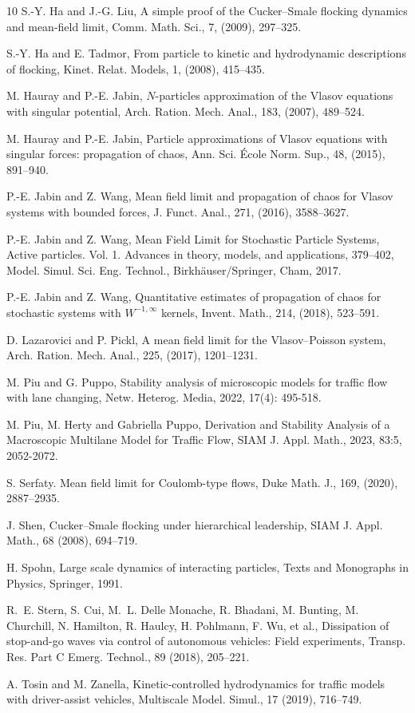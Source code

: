 \documentclass[10pt, reqno]{amsart}
\theoremstyle{definition}
\theoremstyle{remark}
\numberwithin{equation}{section}
\begin{document}
\begin{thebibliography}{10}
 S.-Y. Ha and J.-G. Liu, A simple proof of the Cucker--Smale flocking dynamics and mean-field limit, Comm. Math. Sci., 7, (2009), 297--325.

 S.-Y. Ha and E. Tadmor, From particle to kinetic and hydrodynamic descriptions of flocking, Kinet. Relat. Models, 1, (2008), 415--435.

 M. Hauray and P.-E. Jabin, $N$-particles approximation of the Vlasov equations with singular potential, Arch. Ration. Mech. Anal., 183, (2007), 489--524. 

 M. Hauray and P.-E. Jabin, Particle approximations of Vlasov equations with singular forces: propagation of chaos, Ann. Sci. \'Ecole Norm. Sup., 48, (2015), 891--940.

 P.-E. Jabin and Z. Wang, Mean field limit and propagation of chaos for Vlasov systems with bounded forces, J. Funct. Anal., 271, (2016), 3588--3627.

 P.-E. Jabin and Z. Wang, Mean Field Limit for Stochastic Particle Systems, Active particles. Vol. 1. Advances in theory, models, and applications, 379--402, Model. Simul. Sci. Eng. Technol., Birkh\"auser/Springer, Cham, 2017.

 P.-E. Jabin and Z. Wang, Quantitative estimates of propagation of chaos for stochastic systems with $W^{-1,\infty}$ kernels, Invent. Math., 214, (2018), 523--591.

 D. Lazarovici and P. Pickl, A mean field limit for the Vlasov--Poisson system, Arch. Ration. Mech. Anal., 225, (2017), 1201--1231.

 M. Piu and G. Puppo, Stability analysis of microscopic models for traffic flow with lane changing, Netw. Heterog. Media, 2022, 17(4): 495-518.

 M. Piu, M. Herty and Gabriella Puppo, Derivation and Stability Analysis of a Macroscopic Multilane Model for Traffic Flow, SIAM J. Appl. Math., 2023, 83:5, 2052-2072.

 S. Serfaty. Mean field limit for Coulomb-type flows, Duke Math. J., 169, (2020), 2887--2935.

 J. Shen, Cucker--Smale flocking under hierarchical leadership, SIAM J. Appl. Math., 68 (2008), 694--719.


 H. Spohn, Large scale dynamics of interacting particles, Texts and Monographs in Physics, Springer, 1991.

  R.~E. Stern, S. Cui, M.~L. Delle Monache, R. Bhadani, M. Bunting, M. Churchill, N. Hamilton, R. Haulcy, H. Pohlmann, F. Wu, et al., Dissipation of stop-and-go waves via control of autonomous vehicles: Field experiments, Transp. Res. Part C Emerg. Technol., 89 (2018), 205--221.

  A. Tosin and M. Zanella, Kinetic-controlled hydrodynamics for traffic models with driver-assist vehicles, Multiscale Model. Simul., 17 (2019), 716--749.



\end{thebibliography}
\end{document}
